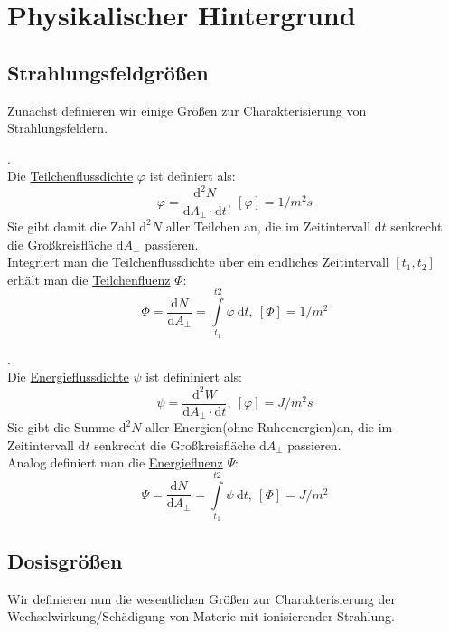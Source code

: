 \section{Physikalischer Hintergrund}
\subsection{Strahlungsfeldgrößen}
Zunächst definieren wir einige Größen zur Charakterisierung  von Strahlungsfeldern.

\begin{definition}.\\
Die \underline{Teilchenflussdichte} $\varphi$ ist definiert als:
\begin{equation*}
	\varphi = \frac{\mathrm{d}^2N}{\mathrm{d}A_{\perp} \cdot \mathrm{d}t},\ [\varphi] = 1/m^2s
\end{equation*}
Sie gibt damit die Zahl $\mathrm{d}^2N$ aller Teilchen an, die im Zeitintervall $\mathrm{d}t$ senkrecht die Großkreisfläche $\mathrm{d}A_{\perp}$ passieren.\\
Integriert man die Teilchenflussdichte über ein endliches Zeitintervall $[t_1,t_2]$ erhält man die \underline{Teilchenfluenz} $\Phi$:
\begin{equation*}
	\Phi = \frac{\mathrm{d}N}{\mathrm{d}A_{\perp}} = \int\limits_{t_1}^{t2} \varphi \ \mathrm{d}t,\ [\Phi] = 1/m^2
\end{equation*}
\end{definition}

\begin{definition}.\\
	Die \underline{Energieflussdichte} $\psi$ ist defininiert als:
\begin{equation*}
	\psi = \frac{\mathrm{d}^2W}{\mathrm{d}A_{\perp} \cdot \mathrm{d}t},\ [\varphi] = J/m^2s
\end{equation*}
Sie gibt die Summe $\mathrm{d}^2N$ aller Energien(ohne Ruheenergien)an, die im Zeitintervall $\mathrm{d}t$ senkrecht die Großkreisfläche $\mathrm{d}A_{\perp}$ passieren.\\
Analog definiert man die \underline{Energiefluenz} $\Psi$:
\begin{equation*}
	\Psi = \frac{\mathrm{d}N}{\mathrm{d}A_{\perp}} = \int\limits_{t_1}^{t2} \psi \ \mathrm{d}t,\ 			[\Phi] = J/m^2
\end{equation*}
\end{definition}

\subsection{Dosisgrößen}
Wir definieren nun die wesentlichen Größen zur Charakterisierung der Wechselwirkung/Schädigung von Materie mit ionisierender Strahlung.

